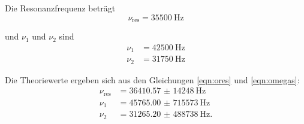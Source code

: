 Die Resonanzfrequenz beträgt
\begin{equation*}
  \nu_\text{res} = \SI{35500}{\Hz}
\end{equation*}

und $\nu_1$ und $\nu_2$ sind
\begin{align*}
  \nu_1 &= \SI{42500}{\Hz} \\
  \nu_2 &= \SI{31750}{\Hz}
\end{align*}

Die Theoriewerte ergeben sich aus den Gleichungen \eqref{eqn:ores} und \eqref{eqn:omegas}:
\begin{align*}
  \nu_\text{res} &= \SI{36410,57(14248)}{\Hz} \\
  \nu_1 &= \SI{45765,00(715573)}{\Hz} \\
  \nu_2 &= \SI{31265,20(488738)}{\Hz}.
\end{align*}
